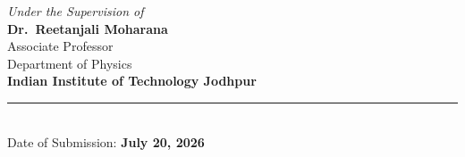 \documentclass[a4paper,12pt]{article}
\begin{document}
\begin{center}
\vspace{0.45cm}
{\large\itshape\color{graytext}Under the Supervision of}\\[0.22cm]
{\LARGE\bfseries\color{navy}Dr.\ Reetanjali Moharana}\\[0.16cm]
{\large Associate Professor}\\[0.05cm]
{\large Department of Physics}\\[0.07cm]
{\large\bfseries\color{navy}Indian Institute of Technology Jodhpur}

\vfill
\textcolor{gold}{\rule{0.72\linewidth}{1pt}}\\[0.28cm]
{\large Date of Submission:\; \textbf{\color{navy}July 20, 2026}}
\vspace{0.15cm}
\end{center}
\end{document}
